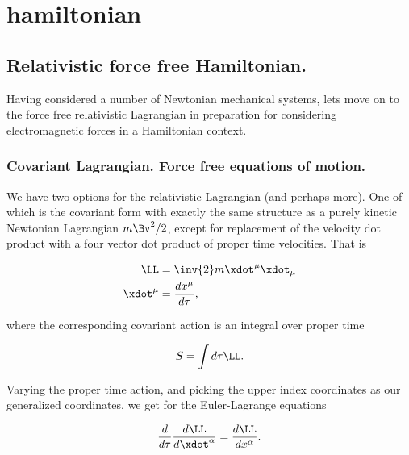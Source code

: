 

\chapter{hamiltonian}
\label{chap:hamiltonian}
{}
\date{Nov 15, 2009}

\beginArtWithToc

\section{Relativistic force free Hamiltonian.}

Having considered a number of Newtonian mechanical systems, lets move on to the force free relativistic Lagrangian in preparation for considering electromagnetic forces in a Hamiltonian context.

\subsection{Covariant Lagrangian.  Force free equations of motion.}

We have two options for the relativistic Lagrangian (and perhaps more).  One of which is the covariant form with exactly the same structure as a purely kinetic Newtonian Lagrangian $m \Bv^2/2$, except for replacement of the velocity dot product with a four vector dot product of proper time velocities.  That is

\begin{align}\label{eqn:hamiltonian:qqq1}
\LL &= \inv{2} m \xdot^\mu \xdot_\mu \\
\xdot^\mu &= \frac{d x^\mu}{d \tau},
\end{align}

where the corresponding covariant action is an integral over proper time

\begin{align}\label{eqn:hamiltonian:qqq2}
S = \int d\tau \LL.
\end{align}

Varying the proper time action, and picking the upper index coordinates as our generalized coordinates, we get for the Euler-Lagrange equations 

\begin{align}\label{eqn:hamiltonian:qqq3}
\frac{d}{d \tau} \frac{d \LL}{d \xdot^\alpha} = \frac{d \LL}{d x^\alpha}.
\end{align}

